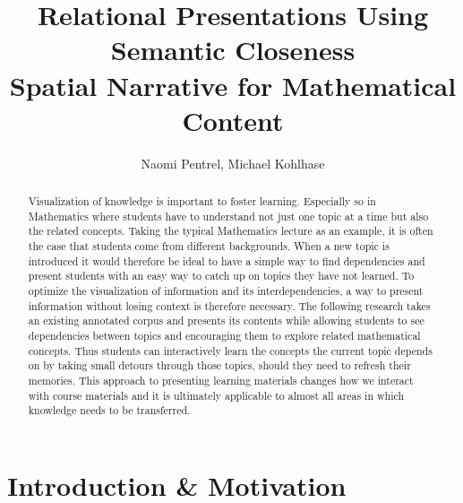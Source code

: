 \documentclass{llncs}
\title{Relational Presentations Using Semantic Closeness\\Spatial Narrative for
  Mathematical Content}
\author{Naomi Pentrel, Michael Kohlhase}
\institute{Jacobs University Bremen}
\begin{document}
\maketitle


\begin{abstract}
Visualization of knowledge is important to foster learning. Especially so in Mathematics where students have to understand not just one topic at a time but also the related concepts. Taking the typical Mathematics lecture as an example, it is often the case that students come from different backgrounds. When a new topic is introduced it would therefore be ideal to have a simple way to find dependencies and present students with an easy way to catch up on topics they have not learned. To optimize the visualization of information and its interdependencies, a way to present information without losing context is therefore necessary. The following research takes an existing annotated corpus and presents its contents while allowing students to see dependencies between topics and encouraging them to explore related mathematical concepts. Thus students can interactively learn the concepts the current topic depends on by taking small detours through those topics, should they need to refresh their memories. This approach to presenting learning materials changes how we interact with course materials and it is ultimately applicable to almost all areas in which knowledge needs to be transferred.
\end{abstract}

\section{Introduction \& Motivation}
\label{sec:introduction}
\end{document}
